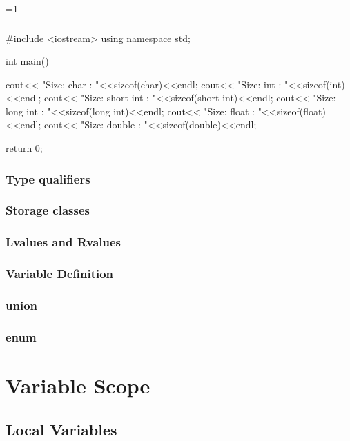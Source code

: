 \documentclass[10pt,a4paper]{scrartcl}
\gdef\conditionmacro{1}
\begin{document}
\begin{multicols*}{2}
\ifnum\conditionmacro=1
\subsubsection{}
\begin{TPCpp}
#include <iostream>
using namespace std;

int main() {
   cout<< "Size: char : "<<sizeof(char)<<endl;
   cout<< "Size: int : "<<sizeof(int)<<endl;
   cout<< "Size: short int : "<<sizeof(short int)<<endl;
   cout<< "Size: long int : "<<sizeof(long int)<<endl;
   cout<< "Size: float : "<<sizeof(float)<<endl;
   cout<< "Size: double : "<<sizeof(double)<<endl;
   
   return 0;
}
\end{TPCpp}
\fi

\subsubsection{Type qualifiers}

\subsubsection{Storage classes}

\subsubsection{Lvalues and Rvalues}

\subsubsection{Variable Definition}

\subsubsection{union}

\subsubsection{enum}

\section{Variable Scope}

\subsection{Local Variables}


\end{multicols*}
\end{document}
